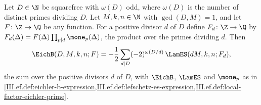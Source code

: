 Let $D\in\N$ be squarefree with $\omega(D)$ odd, where $\omega(D)$ is the number of distinct primes dividing $D$. Let $M,k,n\in\N$ with
$\gcd(D,M)=1$, and let $F\colon\Z\to\Q$ be any function. For a positive divisor $d$ of $D$ define $F_d\colon\Z\to\Q$ by
$F_d(\Delta)=F(\Delta)\prod_{p\mid d}\mone_p(\Delta)$, the product over the primes dividing $d$. Then
\[
  \EichB(D,M,k,n;F)=-\frac12\sum_{d\mid D}(-2)^{\omega(D/d)}\,\LamES(dM,k,n;F_d),
\]
the sum over the positive divisors $d$ of $D$, with $\EichB$, $\LamES$ and $\mone_p$ as in
\cref{III.ef.def:eichler-b-expression,III.ef.def:lefschetz-es-expression,III.ef.def:local-factor-eichler-prime}.
